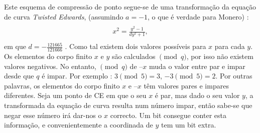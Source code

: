 \begin{enumerate}

Este esquema de compressão de ponto segue-se de uma transformação da equação de curva {\em Twisted Edwards}, (assumindo $a = -1$, o que é verdade para Monero) :
\begin{align*}
\\
x^2 = \frac{y^2-1}{d y^2+1} ,
\\
\end{align*}
em que $d = - \frac{121665}{121666}$ . Como tal existem dois valores possíveis para $x$ para cada $y$. Os elementos do corpo finito $x$ e $y$ são calculados $\pmod{q}$, por isso não existem valores negativos. No entanto, $\pmod{q}$ de $–x$ muda o valor entre par e impar desde que $q$ é impar. Por exemplo : $3 \pmod{5} = 3$, $-3 \pmod{5} = 2$. Por outras palavras, os elementos do corpo finito $x$ e $–x$ têm valores pares e impares diferentes.    
Seja um ponto de CE em que o seu $x$ é par, mas dado o seu valor $y$, a transformada da equação de curva resulta num número impar, então sabe-se que negar esse número irá dar-nos o $x$ correcto. Um bit consegue conter esta informação, e convenientemente a coordinada de $y$ tem um bit extra.




\end{enumerate}
